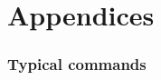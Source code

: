 \documentclass{JHEP3}
\begin{document}
%
%
%



\cleardoublepage
\part{Appendices}
\appendix


\section{Typical  commands}
\label{app:agilerunmc}
\end{document}
